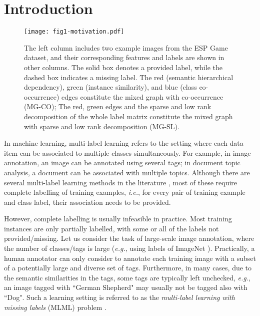 \documentclass[twocolumn]{svjour3}          %
\begin{document}
\section{Introduction}
\label{sec: 1 introduction}


\begin{figure*}[phtb]
\centering
\texttt{[image: fig1-motivation.pdf]}
\caption{
    The left column includes two example images from the ESP Game \cite{esp-game-2004} dataset, and their corresponding features and labels are shown in other columns.
    The solid box denotes a provided label, while the dashed box indicates a missing label.
The red (semantic hierarchical dependency), green (instance similarity),  and blue (class co-occurrence) edges constitute the mixed graph with co-occurrence (MG-CO); 
The red, green edges and the sparse and low rank decomposition of the whole label matrix constitute the mixed graph with sparse and low rank decomposition (MG-SL).
   }
\label{fig1: motivation}
\end{figure*}


In machine learning, multi-label learning refers to the setting where each data item can be associated to multiple classes simultaneously.
For example, in image annotation, an image can be annotated using several tags; in document topic analysis, a document can be associated with multiple topics. 
Although there are several multi-label learning methods in the literature \cite{mlknn-pr-2007}\cite{multilabel-review-tkde-2014}, most of these require complete labelling of training examples, {\it i.e.}, for every pair of training example and class label, their association needs to be provided.

However, complete labelling is usually infeasible in practice. Most training instances are only partially labelled, with some or all of the labels not provided/missing. Let us consider the task of large-scale image annotation, where the number of classes/tags is large ({\it e.g.}, using labels of ImageNet \cite{imagenet-cvpr-2009}). Practically, a human annotator can only consider to annotate each training image with a subset of a potentially large and diverse set of tags. Furthermore, in many cases, due to the semantic similarities in the tags, some tags are typically left unchecked, {\it e.g.}, an image tagged with ``German Shepherd" may usually not be tagged also with ``Dog".
Such a learning setting is referred to as the { \it multi-label learning with missing labels} (MLML) problem \cite{my-icpr-2014,LEML-ICML-2014}.
\end{document}
